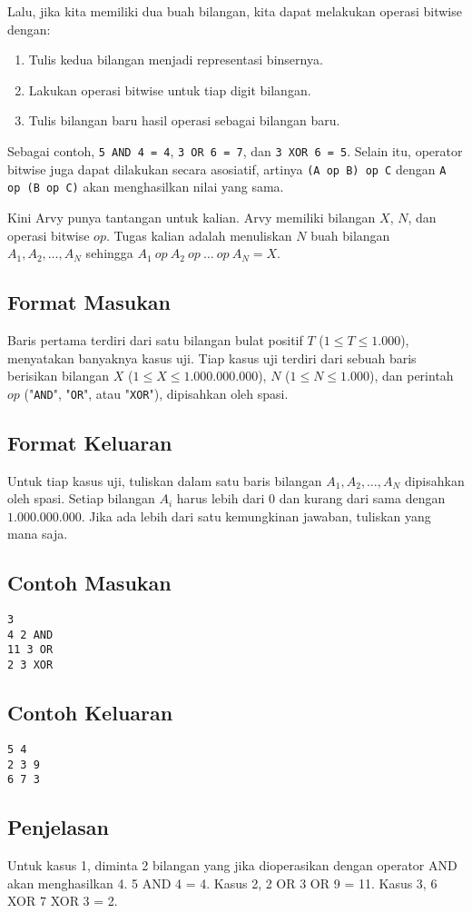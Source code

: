 \documentclass{article}
\begin{document}
Lalu, jika kita memiliki dua buah bilangan, kita dapat melakukan operasi bitwise dengan:
\begin{enumerate}
    \item Tulis kedua bilangan menjadi representasi binsernya.
    \item Lakukan operasi bitwise untuk tiap digit bilangan.
    \item Tulis bilangan baru hasil operasi sebagai bilangan baru.
\end{enumerate}

Sebagai contoh, \lstinline{5 AND 4 = 4}, \lstinline{3 OR 6 = 7}, dan \lstinline{3 XOR 6 = 5}.
Selain itu, operator bitwise juga dapat dilakukan secara asosiatif, artinya \lstinline{(A op B) op C} dengan \lstinline{A op (B op C)} akan menghasilkan nilai yang sama.

Kini Arvy punya tantangan untuk kalian.
Arvy memiliki bilangan $X$, $N$, dan operasi bitwise $op$.
Tugas kalian adalah menuliskan $N$ buah bilangan $A_1, A_2, \dots, A_N$ sehingga $A_1 \  op \  A_2 \  op \  \dots \  op \  A_N = X$.

\subsection*{Format Masukan}

Baris pertama terdiri dari satu bilangan bulat positif $T$ ($1 \leq T \leq 1.000$), menyatakan banyaknya kasus uji.
Tiap kasus uji terdiri dari sebuah baris berisikan bilangan $X$ ($1 \leq X \leq 1.000.000.000$), $N$ ($1 \leq N \leq 1.000$), dan perintah $op$ ("\lstinline{AND}", "\lstinline{OR}", atau "\lstinline{XOR}"), dipisahkan oleh spasi.

\subsection*{Format Keluaran}

Untuk tiap kasus uji, tuliskan dalam satu baris bilangan $A_1, A_2, \dots, A_N$ dipisahkan oleh spasi.
Setiap bilangan $A_i$ harus lebih dari $0$ dan kurang dari sama dengan $1.000.000.000$.
Jika ada lebih dari satu kemungkinan jawaban, tuliskan yang mana saja.

\begin{multicols}{2}
\subsection*{Contoh Masukan}
\begin{lstlisting}
3
4 2 AND
11 3 OR
2 3 XOR
\end{lstlisting}
\columnbreak
\subsection*{Contoh Keluaran}
\begin{lstlisting}
5 4
2 3 9
6 7 3
\end{lstlisting}
\vfill
\null
\end{multicols}
\subsection*{Penjelasan}
 Untuk kasus 1, diminta 2 bilangan yang jika dioperasikan dengan operator AND akan menghasilkan 4. 5 AND 4 = 4. Kasus 2, 2 OR 3 OR 9 = 11. Kasus 3, 6 XOR 7 XOR 3 = 2.

\pagebreak
\end{document}
